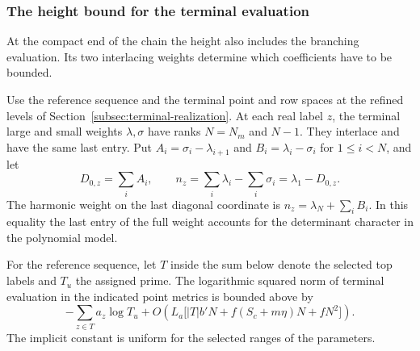 \subsubsection{The height bound for the terminal evaluation}
\label{subsec:selected-terminal-height}

At the compact end of the chain the height also includes the branching evaluation. Its two interlacing weights determine which coefficients have to be bounded.

Use the reference sequence and the terminal point and row spaces at the refined levels of Section~\ref{subsec:terminal-realization}. At each
real label \(z\), the terminal large and small weights
\(\lambda,\sigma\) have ranks \(N=N_m\) and \(N-1\).
They interlace and have the same last entry. Put
\(A_i=\sigma_i-\lambda_{i+1}\) and \(B_i=\lambda_i-\sigma_i\)
for \(1\le i<N\), and let
\[
 D_{0,z}=\sum_i A_i,\qquad
 n_z=\sum_i\lambda_i-\sum_i\sigma_i=\lambda_1-D_{0,z}.
\]
The harmonic weight on the last diagonal coordinate is
\(n_z=\lambda_N+\sum_i B_i\). In this equality the last
entry of the full weight accounts for the determinant
character in the polynomial model.

\begin{proposition}\label{prop:terminal-evaluation-height}
For the reference sequence, let \(T\) inside the sum below
denote the selected top labels and \(T_u\) the assigned prime.
The logarithmic squared norm of terminal evaluation in the
indicated point metrics is bounded above by
\[
 -\sum_{z\in T}a_z\log T_u
 +O\!\left(L_a\bigl[|T|b'N+
     f(S_c+m\eta)N+fN^2\bigr]\right).
\]
The implicit constant is uniform for the selected ranges of the parameters.
\end{proposition}

